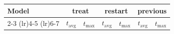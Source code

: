\begin{tabular}{lrrrrrr}
\toprule
\multirow{2}{*}{Model} & \multicolumn{2}{c}{treat} & \multicolumn{2}{c}{restart} & \multicolumn{2}{c}{previous} \\
    \cmidrule(lr){2-3} \cmidrule(lr){4-5} \cmidrule(lr){6-7}
 & $t_\text{avg}$ & $t_\text{max}$ & $t_\text{avg}$ & $t_\text{max}$ & $t_\text{avg}$ & $t_\text{max}$ \\
\midrule
\bottomrule
\end{tabular}

